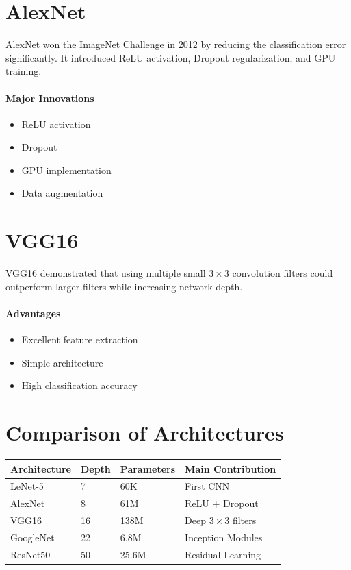 \documentclass[11pt]{article}
\begin{document}
\section{AlexNet}
AlexNet won the ImageNet Challenge in 2012 by reducing the classification error significantly. It introduced ReLU activation, Dropout regularization, and GPU training.

\paragraph{Major Innovations}
\begin{itemize}[leftmargin=*]
    \item ReLU activation
    \item Dropout
    \item GPU implementation
    \item Data augmentation
\end{itemize}

\section{VGG16}
VGG16 demonstrated that using multiple small $3 \times 3$ convolution filters could outperform larger filters while increasing network depth.

\paragraph{Advantages}
\begin{itemize}[leftmargin=*]
    \item Excellent feature extraction
    \item Simple architecture
    \item High classification accuracy
\end{itemize}

\section{Comparison of Architectures}
\begin{table}[H]
\centering
\begin{tabular}{|l|l|l|p{6cm}|}
\hline
\textbf{Architecture} & \textbf{Depth} & \textbf{Parameters} & \textbf{Main Contribution} \\ \hline
LeNet-5 & 7 & 60K & First CNN \\ \hline
AlexNet & 8 & 61M & ReLU + Dropout \\ \hline
VGG16 & 16 & 138M & Deep $3 \times 3$ filters \\ \hline
GoogleNet & 22 & 6.8M & Inception Modules \\ \hline
ResNet50 & 50 & 25.6M & Residual Learning \\ \hline
\end{tabular}
\end{table}
\end{document}
